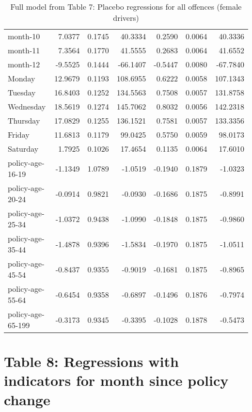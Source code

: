 \documentclass[10pt]{article}
\begin{document}
\begin{table}[ht]
\begin{tabular}{lrrrrrr}
  month-10 & 7.0377 & 0.1745 & 40.3334 & 0.2590 & 0.0064 & 40.3336 \\ 
  month-11 & 7.3564 & 0.1770 & 41.5555 & 0.2683 & 0.0064 & 41.6552 \\ 
  month-12 & -9.5525 & 0.1444 & -66.1407 & -0.5447 & 0.0080 & -67.7840 \\ 
  Monday & 12.9679 & 0.1193 & 108.6955 & 0.6222 & 0.0058 & 107.1343 \\ 
  Tuesday & 16.8403 & 0.1252 & 134.5563 & 0.7508 & 0.0057 & 131.8758 \\ 
  Wednesday & 18.5619 & 0.1274 & 145.7062 & 0.8032 & 0.0056 & 142.2318 \\ 
  Thursday & 17.0829 & 0.1255 & 136.1521 & 0.7581 & 0.0057 & 133.3356 \\ 
  Friday & 11.6813 & 0.1179 & 99.0425 & 0.5750 & 0.0059 & 98.0173 \\ 
  Saturday & 1.7925 & 0.1026 & 17.4654 & 0.1135 & 0.0064 & 17.6010 \\ 
  policy-age-16-19 & -1.1349 & 1.0789 & -1.0519 & -0.1940 & 0.1879 & -1.0323 \\ 
  policy-age-20-24 & -0.0914 & 0.9821 & -0.0930 & -0.1686 & 0.1875 & -0.8991 \\ 
  policy-age-25-34 & -1.0372 & 0.9438 & -1.0990 & -0.1848 & 0.1875 & -0.9860 \\ 
  policy-age-35-44 & -1.4878 & 0.9396 & -1.5834 & -0.1970 & 0.1875 & -1.0511 \\ 
  policy-age-45-54 & -0.8437 & 0.9355 & -0.9019 & -0.1681 & 0.1875 & -0.8965 \\ 
  policy-age-55-64 & -0.6454 & 0.9358 & -0.6897 & -0.1496 & 0.1876 & -0.7974 \\ 
  policy-age-65-199 & -0.3173 & 0.9345 & -0.3395 & -0.1028 & 0.1878 & -0.5473 \\ 
   \hline
\end{tabular}
\caption{Full model from Table 7: Placebo regressions for all offences (female drivers)} 
\label{tab_7_all_pts_with_age_F}
\end{table}


\clearpage
\pagebreak




\section{Table 8: Regressions with indicators for month since policy change}
\end{document}
